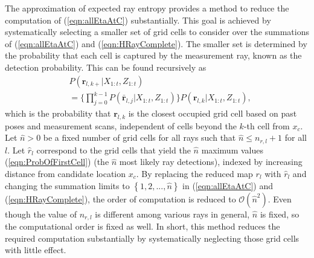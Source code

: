\documentclass[letterpaper, 10pt]{ieeeconf}
\newcommand{\braces}[1]{\ensuremath{\left\{ #1 \right\}}}
\newcommand{\refeqn}[1]{(\ref{eqn:#1})}
\begin{document}
The approximation of expected ray entropy provides a method to reduce the computation of \refeqn{allEtaAtC} substantially. This goal is achieved by systematically selecting a smaller set of grid cells to consider over the summations of \refeqn{allEtaAtC} and \refeqn{HRayComplete}.
The smaller set is determined by the probability that each cell is captured by the measurement ray, known as the detection probability. This can be found recursively as
%
%
%
\begin{align}
\label{eqn:ProbOfFirstCell}
&P(\mathbf{r}_{l,k+}|X_{1:t},Z_{1:t})\nonumber\\&=\bigg\{\prod_{j=0}^{k-1}P(\bar{\mathbf{r}}_{l,j}|X_{1:t},Z_{1:t})\bigg\}P(\mathbf{r}_{l,k}|X_{1:t},Z_{1:t}),
\end{align}
which is the probability that $\mathbf{r}_{l,k}$ is the closest occupied grid cell based on past poses and measurement scans, independent of cells beyond the $k$-th cell from $x_c$.
Let $\hat n>0$ be a fixed number of grid cells for all rays such that $\hat n\leq n_{r,l}+1$ for all $l$.
Let $\hat{r}_{l}$ correspond to the grid cells that yield the $\hat{n}$ maximum values \refeqn{ProbOfFirstCell} (the $\hat n$ most likely ray detections), indexed by increasing distance from candidate location $x_c$.
By replacing the reduced map $r_l$ with $\hat{r}_l$ and changing the summation limits to $\braces{1,2,...,\hat n}$ in \refeqn{allEtaAtC} and \refeqn{HRayComplete}, the order of computation is reduced to $\mathcal O({\hat{n}}^2)$.
Even though the value of $n_{r,l}$ is different among various rays in general, $\hat n$ is fixed, so the computational order is fixed as well.
In short, this method reduces the required computation substantially by systematically neglecting those grid cells with little effect.
%
%
\end{document}
